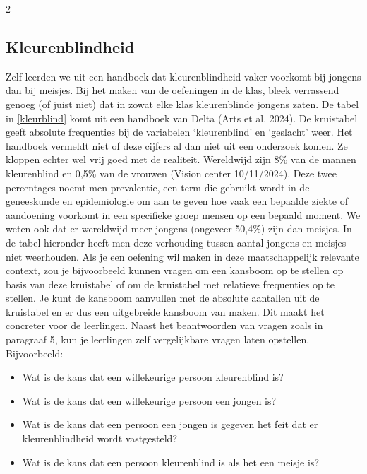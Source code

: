 \begin{multicols} {2}
\subsection{Kleurenblindheid}
Zelf leerden we uit een handboek dat kleurenblindheid vaker voorkomt bij jongens dan bij meisjes. Bij het maken van de oefeningen in de klas, bleek verrassend genoeg (of juist niet) dat in zowat elke klas kleurenblinde jongens zaten. 
De tabel in \autoref{kleurblind} komt uit een handboek van Delta (Arts et al. 2024). De kruistabel geeft absolute frequenties bij de variabelen ‘kleurenblind’ en ‘geslacht’ weer. Het handboek vermeldt niet of deze cijfers al dan niet uit een onderzoek komen. Ze kloppen echter wel vrij goed met de realiteit. Wereldwijd zijn 8\% van de mannen kleurenblind en 0,5\% van de vrouwen (Vision center 10/11/2024). Deze twee percentages noemt men prevalentie, een term die gebruikt wordt in de geneeskunde en epidemiologie om aan te geven hoe vaak een bepaalde ziekte of aandoening voorkomt in een specifieke groep mensen op een bepaald moment. We weten ook dat er wereldwijd meer jongens (ongeveer 50,4\%) zijn dan meisjes. In de tabel hieronder heeft men deze verhouding tussen aantal jongens en meisjes niet weerhouden. 
Als je een oefening wil maken in deze maatschappelijk relevante context, zou je bijvoorbeeld kunnen vragen om een kansboom op te stellen op basis van deze kruistabel of om de kruistabel met relatieve frequenties op te stellen. Je kunt de kansboom aanvullen met de absolute aantallen uit de kruistabel en er dus een uitgebreide kansboom van maken. Dit maakt het concreter voor de leerlingen.
Naast het beantwoorden van vragen zoals in paragraaf 5, kun je leerlingen zelf vergelijkbare vragen laten opstellen. Bijvoorbeeld:
\begin{itemize}
    \item Wat is de kans dat een willekeurige persoon kleurenblind is? 
    \item Wat is de kans dat een willekeurige persoon een jongen is? 
    \item Wat is de kans dat een persoon een jongen is gegeven het feit dat er kleurenblindheid wordt vastgesteld?
    \item Wat is de kans dat een persoon kleurenblind is als het een meisje is?
\end{itemize}


\end{multicols}
